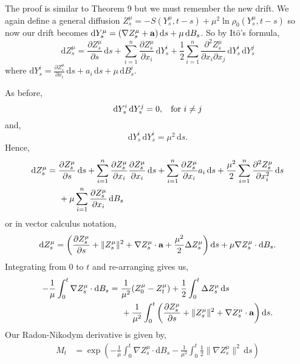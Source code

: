 \documentclass[a4paper,12pt,draft]{report}
\theoremstyle{remark}
\theoremstyle{definition}
\begin{document}
{
The proof is similar to Theorem 9 but we must remember the new drift.  We again define a general diffusion $Z_s^\mu = -S(Y_s^\mu, t - s) + \mu^2\ln\rho_0(Y_s^\mu, t - s)$ so now our drift becomes $\mathrm{d}Y_s^\mu = (\nabla Z_s^\mu + \bold{a})\,\mathrm{d}s + \mu\,\mathrm{d}B_s$.  So by It$\mathrm{\hat{o}}$'s formula,
$$
\mathrm{d}Z_s^\mu = \frac{\partial Z_s^\mu}{\partial s}\,\mathrm{d}s + \sum_{i = 1}^n\frac{\partial Z_s^\mu}{\partial x_i}\,\mathrm{d}Y_s^i + \frac{1}{2}\sum_{i = 1}^n\frac{\partial^2 Z_s^\mu}{\partial x_i \partial x_j}\,\mathrm{d}Y_s^i\,\mathrm{d}Y_s^j
$$
where $\mathrm{d}Y_s^i = \frac{\partial Z_s^\mu}{\partial x_i}\,\mathrm{d}s + a_i\,\mathrm{d}s + \mu\,\mathrm{d}B_s^i$.

As before,
$$
\mathrm{d}Y_s^i\,\mathrm{d}Y_s^j = 0, \hspace{0.3cm} \text{for } i \ne j
$$
and,
$$
\mathrm{d}Y_s^i\,\mathrm{d}Y_s^i = \mu^2\,\mathrm{d}s.
$$
Hence,
\begin{align}
\mathrm{d}Z_s^\mu & = \frac{\partial Z_s^\mu}{\partial s}\,\mathrm{d}s + \sum_{i = 1}^n\frac{\partial Z_s^\mu}{\partial x_i}\frac{\partial Z_s^\mu}{\partial x_i}\,\mathrm{d}s + \sum_{i = 1}^n\frac{\partial Z_s^\mu}{\partial x_i}a_i\,\mathrm{d}s + \frac{\mu^2}{2}\sum_{i = 1}^n\frac{\partial^2Z_s^\mu}{\partial x_i^2}\,\mathrm{d}s\nonumber\\
& \hspace{0.5cm} + \mu\sum_{i = 1}^n\frac{\partial Z_s^\mu}{\partial x_i}\,\mathrm{d}B_s\nonumber
\end{align}
or in vector calculus notation,
$$
\mathrm{d}Z_s^\mu = \left(\frac{\partial Z_s^\mu}{\partial s} + \|Z_s^\mu\|^2 + \nabla Z_s^\mu\cdot\bold{a} + \frac{\mu^2}{2}\Delta Z_s^\mu\right)\mathrm{d}s + \mu\nabla Z_s^\mu\cdot\mathrm{d}B_s.
$$
Integrating from $0$ to $t$ and re-arranging gives us,
\begin{align}
-\frac{1}{\mu}\int_0^t\nabla Z_s^\mu\cdot\mathrm{d}B_s & = \frac{1}{\mu^2}(Z_0^\mu - Z_t^\mu) + \frac{1}{2}\int_0^t\Delta Z_s^\mu\,\mathrm{d}s\nonumber\\
& \hspace{0.5cm} + \frac{1}{\mu^2}\int_0^t\left(\frac{\partial Z_s^\mu}{\partial s} + \|Z_s^\mu\|^2 + \nabla Z_s^\mu\cdot\bold{a}\right)\mathrm{d}s.\nonumber
\end{align}
Our Radon-Nikodym derivative is given by,
\begin{align}
M_t & = \exp\left(-\frac{1}{\mu}\int_0^t\nabla Z_s^\mu\cdot\mathrm{d}B_s - \frac{1}{\mu^2}\int_0^t\frac{1}{2}\|\nabla Z_s^\mu\|^2\,\mathrm{d}s\right)\nonumber\\

\end{align}}
\end{document}
